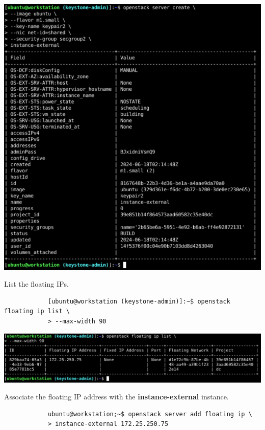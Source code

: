 \documentclass[letterpaper, 12pt]{article}
\begin{document}
\begin{enumerate}
\begin{labstep}
        \begin{center}
            \includegraphics[width=\linewidth]{images/part6/step3.png}
        \end{center}
    \end{labstep}

    \begin{labstep}
        List the floating IPs.
        \begin{lstlisting}
            [ubuntu@workstation (keystone-admin)]:~$ openstack floating ip list \
            > --max-width 90
        \end{lstlisting}

        \begin{center}
            \includegraphics[width=\linewidth]{images/part6/step4.png}
        \end{center}
    \end{labstep}

    \begin{labstep}
        Associate the floating IP address with the \textbf{instance-external} instance.
        \begin{lstlisting}
            ubuntu@workstation;~$ openstack server add floating ip \
            > instance-external 172.25.250.75
        \end{lstlisting}


\end{labstep}
\end{enumerate}
\end{document}
